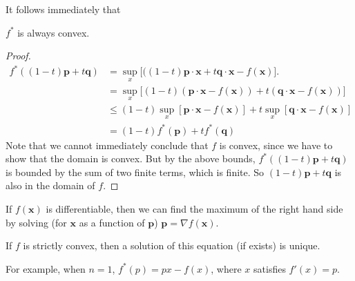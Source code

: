 \documentclass[a4paper]{article}
\begin{document}
It follows immediately that
\begin{lemma}
  $f^*$ is always convex.
\end{lemma}

\begin{proof}
  \begin{align*}
    f^*((1 - t)\mathbf{p} + t\mathbf{q}) &= \sup_x \big[((1 - t)\mathbf{p}\cdot \mathbf{x} + t\mathbf{q}\cdot \mathbf{x} - f(\mathbf{x})\big].\\
    &= \sup_x \big[(1 - t)(\mathbf{p}\cdot \mathbf{x} - f(\mathbf{x})) + t(\mathbf{q}\cdot \mathbf{x} - f(\mathbf{x}))\big]\\
    &\leq (1 - t)\sup_x [\mathbf{p}\cdot \mathbf{x} - f(\mathbf{x})] + t\sup_x[\mathbf{q}\cdot \mathbf{x}  - f(\mathbf{x})]\\
    &= (1 - t)f^*(\mathbf{p}) + tf^*(\mathbf{q})
  \end{align*}
  Note that we cannot immediately conclude that $f$ is convex, since we have to show that the domain is convex. But by the above bounds, $f^*((1 - t)\mathbf{p} + t\mathbf{q})$  is bounded by the sum of two finite terms, which is finite. So $(1 - t)\mathbf{p} + t\mathbf{q}$ is also in the domain of $f$.
\end{proof}

If $f(\mathbf{x})$ is differentiable, then we can find the maximum of the right hand side by solving (for $\mathbf{x}$ as a function of $\mathbf{p}$) $\mathbf{p} = \nabla f(\mathbf{x})$.

If $f$ is strictly convex, then a solution of this equation (if exists) is unique.

For example, when $n = 1$, $f^*(p) = px - f(x)$, where $x$ satisfies $f'(x) = p$.

\begin{center}
\end{center}
\end{document}
